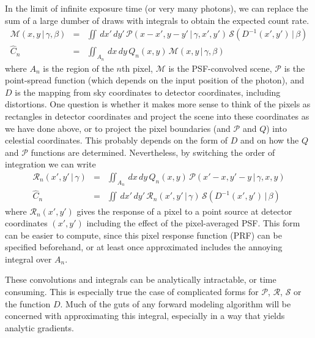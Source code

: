 \documentclass[modern]{aastex62}
\newcommand{\given}{\,|\,}
\newcommand{\countrate}{\hat{C}}
\newcommand{\model}{\mathcal{M}}
\newcommand{\psf}{\mathcal{P}}
\newcommand{\prf}{\mathcal{R}}
\newcommand{\qe}{Q}
\newcommand{\scene}{\mathcal{S}}
\begin{document}
In the limit of infinite exposure time (or very many photons), we can replace the sum of a large dumber of draws with integrals to obtain the expected count rate.
\begin{eqnarray}
\label{eqn:psf_convolve}
\model(x, y \given \gamma, \beta) & = & \iint \, dx' \, dy' \, \psf(x - x', y-y' \given \gamma, x', y') \, \scene( D^{-1}(x', y') \given \beta) \\
\countrate_n & = & \iint_{A_n} \, dx \, dy \, \qe_n(x, y) \, \model(x, y \given \gamma, \beta) \nonumber
\end{eqnarray}
where $A_n$ is the region of the $n$th pixel, 
$\model$ is the PSF-convolved scene,
$\psf$ is the point-spread function (which depends on the input position of the photon),
and $D$ is the mapping from sky coordinates to detector coordinates, including distortions.
One question is whether it makes more sense to think of the pixels as rectangles in detector coordinates and project the scene into these coordinates as we have done above, 
or to project the pixel boundaries (and $\psf$ and $\qe$) into celestial coordinates.
This probably depends on the form of $D$ and on how the $\qe$ and $\psf$ functions are determined.
Nevertheless, by switching the order of integration we can write
\begin{eqnarray}
\label{eqn:prf_integral}
\prf_n(x', y' \given \gamma) & = & \iint_{A_n} \, dx \, dy \, \qe_n(x, y) \, \psf(x' - x, y' - y \given \gamma, x, y) \\
\countrate_n & = & \iint \, dx' \, dy' \, \prf_n(x', y' \given \gamma) \, \scene( D^{-1}(x', y') \given \beta) \nonumber
\end{eqnarray}
where $\prf_n(x', y')$ gives the response of a pixel to a point source at detector coordinates $(x', y')$ including the effect of the pixel-averaged PSF.
This form can be easier to compute, since this pixel response function (PRF) can be specified beforehand, or at least once approximated includes the annoying integral over $A_n$.

These convolutions and integrals can be analytically intractable, or time consuming.
This is especially true the case of complicated forms for $\psf$, $\prf$, $\scene$ or the function $D$.
Much of the guts of any forward modeling algorithm will be concerned with approximating this integral,
 especially in a way that yields analytic gradients.
\end{document}
